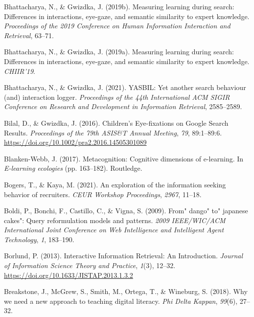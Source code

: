 \documentclass[letterpaper, nobind]{templates/ociamthesis}
\newlength{\cslhangindent}
\newenvironment{CSLReferences}[2] %
 {%
  \setlength{\parindent}{0pt}
  \ifodd #1
  \let\oldpar\par
  \def\par{\hangindent=\cslhangindent\oldpar}
  \fi
  \setlength{\parskip}{1mm}
  \setlength{\baselineskip}{6mm}
 }%
 {}
\begin{document}
\begin{CSLReferences}{1}{0}
\leavevmode{}%
Bhattacharya, N., \& Gwizdka, J. (2019b). Measuring learning during search: Differences in interactions, eye-gaze, and semantic similarity to expert knowledge. \emph{Proceedings of the 2019 Conference on Human Information Interaction and Retrieval}, 63--71.

\leavevmode{}%
Bhattacharya, N., \& Gwizdka, J. (2019a). Measuring learning during search: Differences in interactions, eye-gaze, and semantic similarity to expert knowledge. \emph{CHIIR'19}.

\leavevmode{}%
Bhattacharya, N., \& Gwizdka, J. (2021). YASBIL: Yet another search behaviour (and) interaction logger. \emph{Proceedings of the 44th International ACM SIGIR Conference on Research and Development in Information Retrieval}, 2585--2589.

\leavevmode{}%
Bilal, D., \& Gwizdka, J. (2016). Children's {Eye}-fixations on {Google Search Results}. \emph{Proceedings of the 79th {ASIS}\&{T Annual Meeting}}, \emph{79}, 89:1--89:6. \url{https://doi.org/10.1002/pra2.2016.14505301089}

\leavevmode{}%
Blanken-Webb, J. (2017). Metacognition: Cognitive dimensions of e-learning. In \emph{E-learning ecologies} (pp. 163--182). Routledge.

\leavevmode{}%
Bogers, T., \& Kaya, M. (2021). An exploration of the information seeking behavior of recruiters. \emph{CEUR Workshop Proceedings}, \emph{2967}, 11--18.

\leavevmode{}%
Boldi, P., Bonchi, F., Castillo, C., \& Vigna, S. (2009). From" dango" to" japanese cakes": Query reformulation models and patterns. \emph{2009 IEEE/WIC/ACM International Joint Conference on Web Intelligence and Intelligent Agent Technology}, \emph{1}, 183--190.

\leavevmode{}%
Borlund, P. (2013). Interactive {Information Retrieval}: {An Introduction}. \emph{Journal of Information Science Theory and Practice}, \emph{1}(3), 12--32. \url{https://doi.org/10.1633/JISTAP.2013.1.3.2}

\leavevmode{}%
Breakstone, J., McGrew, S., Smith, M., Ortega, T., \& Wineburg, S. (2018). Why we need a new approach to teaching digital literacy. \emph{Phi Delta Kappan}, \emph{99}(6), 27--32.


\end{CSLReferences}
\end{document}
